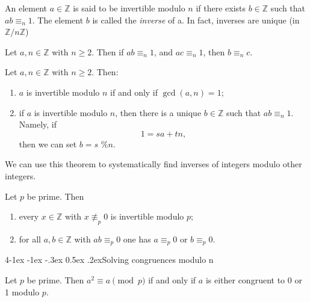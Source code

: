 \documentclass{tufte-handout}
\makeatletter
\renewcommand{\paragraph}{\@startsection{paragraph}%
    {4}{\z@}{-1ex \@plus -1ex \@minus -.3ex}%
    {0.5ex \@plus .2ex}{\normalfont\normalsize\bfseries}}
\makeatother
\begin{document}
\begin{Definition}
    An element \( a \in \mathbb{Z} \) is said to be invertible modulo \( n \) if there exists \( b \in \mathbb{Z} \) such that
    \( ab \equiv_n 1 \). The element \( b \) is called the \textit{inverse} of a.
    In fact, inverses are unique (in \( \mathbb{Z} \slash n \mathbb{Z} \))
\end{Definition}

\begin{Proposition}
    Let \( a,n \in \mathbb{Z}\) with \( n \geq 2 \). Then if \( ab \equiv_n 1 \), and
    \( ac \equiv_n 1 \), then \( b \equiv_n c \).
\end{Proposition}

\begin{Theorem}
    Let \( a,n \in \mathbb{Z} \) with \( n \geq 2 \). Then:
    \begin{enumerate}
        \item \( a \) is invertible modulo \( n \) if and only if \( \gcd(a,n) = 1 \);
        \item if \( a \) is invertible modulo \( n \), then there is a unique \( b \in \mathbb{Z} \) such that
        \( ab \equiv_n 1 \). Namely, if 
        \[ 1 = sa + tn ,\]
        then we can set \( b = s \text{ \% } n\).
    \end{enumerate}
\end{Theorem}

We can use this theorem to systematically find inverses of integers modulo other integers.

\begin{Proposition}
    Let \( p \) be prime. Then
    \begin{enumerate}
        \item every \( x\in \mathbb{Z} \) with \( x \not\equiv_p 0 \) is invertible modulo \( p \);
        \item for all \( a,b \in \mathbb{Z} \) with \( ab\equiv_p 0 \) one has \( a \equiv_p 0 \) or \( b \equiv_p 0 \).
    \end{enumerate}
\end{Proposition}

\paragraph{Solving congruences modulo n}

\begin{Proposition}
    Let \( p \) be prime. Then \( a^2 \equiv a \pmod{p} \) if and only if \( a \) is either
    congruent to 0 or 1 modulo \( p \).
\end{Proposition}
\end{document}
